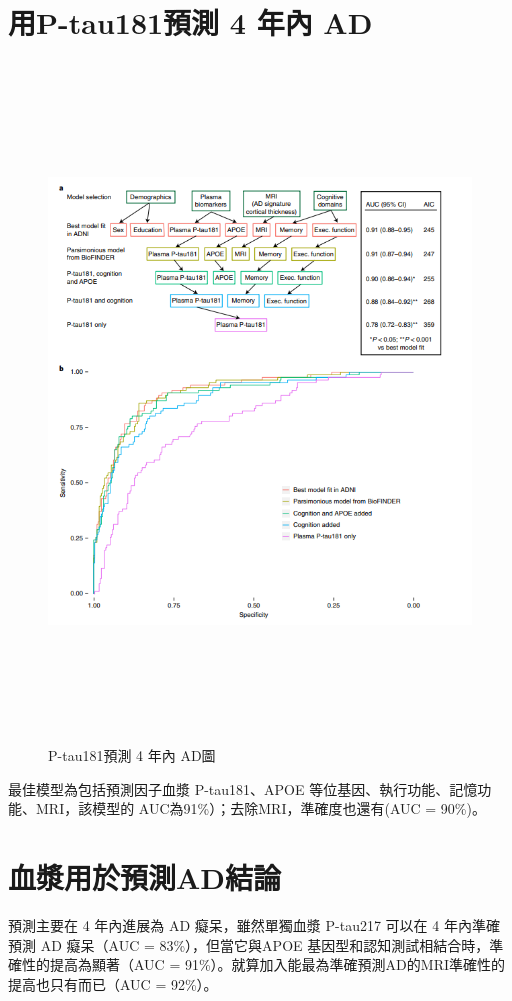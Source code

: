 \section{用P-tau181預測 4 年內 AD }
\begin{figure}[H]
	\centering
	\centerline{\includegraphics[height=18cm]{pic/AD181.PNG}}
	\caption{P-tau181預測 4 年內 AD圖}

	\label{fig:AD181}
\end{figure}
最佳模型為包括預測因子血漿 P-tau181、APOE 等位基因、執行功能、記憶功能、MRI，該模型的 AUC為91\%）；去除MRI，準確度也還有(AUC = 90\%)。


\section{血漿用於預測AD結論}
預測主要在 4 年內進展為 AD 癡呆，雖然單獨血漿 P-tau217 可以在 4 年內準確預測 AD 癡呆（AUC = 83\%），但當它與APOE 基因型和認知測試相結合時，準確性的提高為顯著（AUC = 91\%）。就算加入能最為準確預測AD的MRI準確性的提高也只有而已（AUC = 92\%）。

